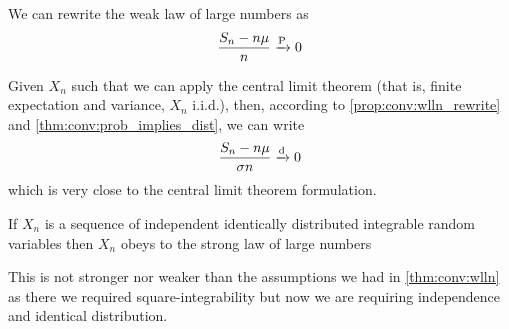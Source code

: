 \documentclass[12pt]{extarticle}
\newcommand{\convdist}{\xrightarrow{\operatorfont d}}
\newcommand{\convprob}{\xrightarrow{\operatorfont P}}
\begin{document}
\begin{proposition}
    \label{prop:conv:wlln_rewrite}
    We can rewrite the weak law of large numbers as
    \begin{equation}
        \frac{S_n - n \mu}{n} \convprob 0
    \end{equation}
\end{proposition}

Given $X_n$ such that we can apply the central limit theorem (that is, finite expectation and variance, $X_n$ i.i.d.), then, according to \autoref{prop:conv:wlln_rewrite} and \autoref{thm:conv:prob_implies_dist}, we can write
\begin{equation}
    \frac{S_n - n \mu}{\sigma n} \convdist 0
\end{equation}
which is very close to the central limit theorem formulation.

\begin{theorem}
    If $X_n$ is a sequence of independent identically distributed integrable random variables then $X_n$ obeys to the strong law of large numbers
\end{theorem}
\begin{remark}
    This is not stronger nor weaker than the assumptions we had in \autoref{thm:conv:wlln} as there we required square-integrability but now we are requiring independence and identical distribution.
\end{remark}
\end{document}
